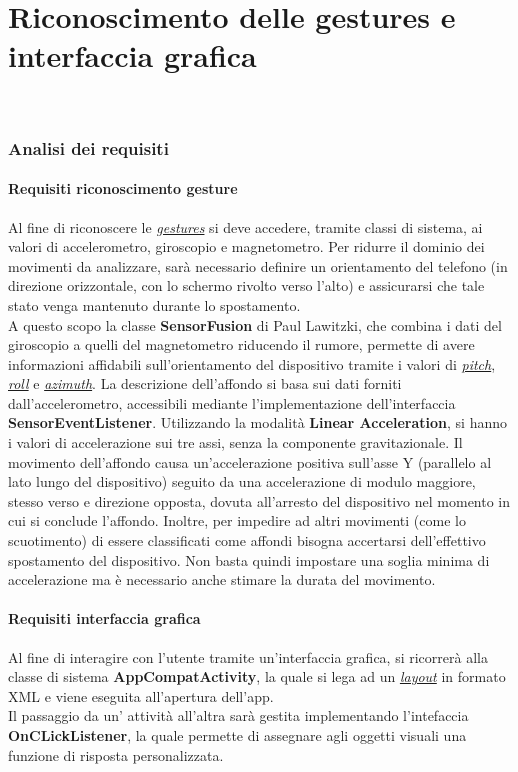 \documentclass[a4paper,11pt]{article}
\begin{document}
\part{Riconoscimento delle gestures e interfaccia grafica}
\ 
\section{Analisi dei requisiti}
\subsection{Requisiti riconoscimento gesture}
Al fine di riconoscere le \hyperref[gesture]{\emph{gestures}} si deve accedere, tramite classi di sistema, ai valori di accelerometro, giroscopio e magnetometro. Per ridurre il dominio dei movimenti da analizzare, sarà necessario definire un orientamento del telefono (in direzione orizzontale, con lo schermo rivolto verso l'alto) e assicurarsi che tale stato venga mantenuto durante lo spostamento.\\ A questo scopo la classe \textbf{SensorFusion} di Paul Lawitzki, che combina i dati del giroscopio a quelli del magnetometro riducendo il rumore, permette di avere informazioni affidabili sull'orientamento del dispositivo tramite i valori di \hyperref[pra]{\emph{pitch}}, \hyperref[pra]{\emph{roll}} e \hyperref[pra]{\emph{azimuth}}. La descrizione dell'affondo si basa sui dati forniti dall'accelerometro, accessibili mediante l'implementazione dell'interfaccia \textbf{SensorEventListener}. Utilizzando la modalità \textbf{Linear Acceleration}, si hanno i valori di accelerazione sui tre assi, senza la componente gravitazionale. Il movimento dell'affondo causa un'accelerazione positiva sull'asse Y (parallelo al lato lungo del dispositivo) seguito da una accelerazione di modulo maggiore, stesso verso e direzione opposta, dovuta all'arresto del dispositivo nel momento in cui si conclude l'affondo. Inoltre, per impedire ad altri movimenti (come lo scuotimento) di essere classificati come affondi bisogna accertarsi dell'effettivo spostamento del dispositivo. Non basta quindi impostare una soglia minima di accelerazione ma è necessario anche stimare la durata del movimento.
\subsection{Requisiti interfaccia grafica}
Al fine di interagire con l'utente tramite un'interfaccia grafica, si ricorrerà alla classe di sistema \textbf{AppCompatActivity}, la quale si lega ad un \hyperref[layout]{\emph{layout}} in formato XML e viene eseguita all'apertura dell'app.\\ Il passaggio da un' attività all'altra sarà gestita implementando l'intefaccia \textbf{OnCLickListener}, la quale permette di assegnare agli oggetti visuali una funzione di risposta personalizzata.
\newpage
\end{document}
